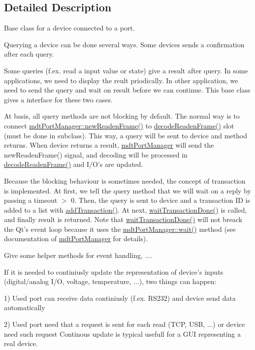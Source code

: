 \subsection{Detailed Description}
Base class for a device connected to a port. 

Querying a device can be done several ways. Some devices sends a confirmation after each query.

Some queries (f.ex. read a input value or state) give a result after query. In some applications, we need to display the reult priodically. In other application, we need to send the query and wait on result before we can continue. This base class gives a interface for these two cases.

At basis, all query methods are not blocking by default. The normal way is to connect \hyperlink{classmdt_port_manager_a65d5d2e9edde76796714f737a7eaf204}{mdtPortManager::newReadenFrame()} to \hyperlink{classmdt_device_a96be3ca9235561c58c69190e9ed45ca9}{decodeReadenFrame()} slot (must be done in subclass). This way, a query will be sent to device and method returns. When device returns a result, \hyperlink{classmdt_port_manager}{mdtPortManager} will send the newReadenFrame() signal, and decoding will be processed in \hyperlink{classmdt_device_a96be3ca9235561c58c69190e9ed45ca9}{decodeReadenFrame()} and I/O's are updated.

Because the blocking behaviour is sometimes needed, the concept of transaction is implemented. At first, we tell the query method that we will wait on a reply by passing a timeout $>$ 0. Then, the query is sent to device and a transaction ID is added to a list with \hyperlink{classmdt_device_a152a866615b291d0344f24948141f9dd}{addTransaction()}. At next, \hyperlink{classmdt_device_a1df875803a3a0eb7324047d33c139621}{waitTransactionDone()} is called, and finally result is returned. Note that \hyperlink{classmdt_device_a1df875803a3a0eb7324047d33c139621}{waitTransactionDone()} will not breack the Qt's event loop because it uses the \hyperlink{classmdt_port_manager_acc5c63ad33fdd3cc153fc23e00c6e69c}{mdtPortManager::wait()} method (see documentation of \hyperlink{classmdt_port_manager}{mdtPortManager} for details).

Give some helper methods for event handling, ....

If it is needed to continiusly update the representation of device's inputs (digital/analog I/O, voltage, temperature, ...), two things can happen:
\begin{DoxyItemize}
\item 1) Used port can receive data continiusly (f.ex. RS232) and device send data automatically
\item 2) Used port need that a request is sent for each read (TCP, USB, ...) or device need such request Continous update is typical usefull for a GUI representing a real device.
\end{DoxyItemize}

